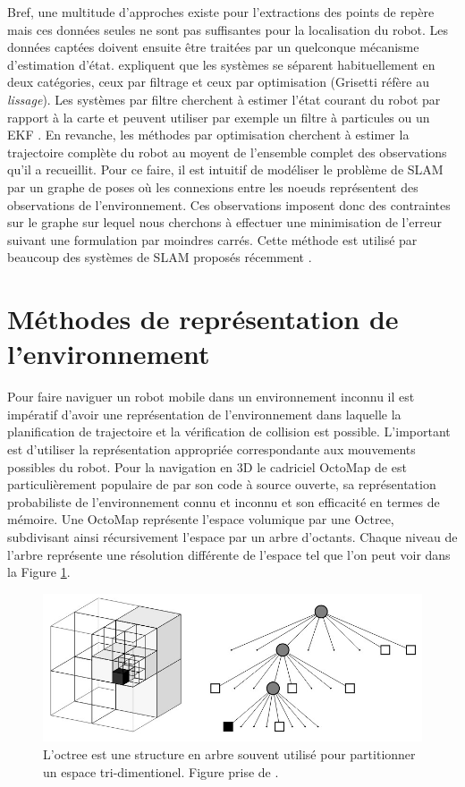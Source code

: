 Bref, une multitude d'approches existe pour l'extractions des points de repère mais ces données seules ne sont pas suffisantes pour la localisation du robot. Les données captées doivent ensuite être traitées par un quelconque mécanisme d'estimation d'état. \cite{Grisetti2010} expliquent que les systèmes se séparent habituellement en deux catégories, ceux par filtrage et ceux par optimisation (Grisetti réfère au \textit{lissage}). Les systèmes par filtre cherchent à estimer l'état courant du robot par rapport à la carte et peuvent utiliser par exemple un filtre à particules \citep{Grisetti2007} ou un EKF \citep{Montemerlo03a}. En revanche, les méthodes par optimisation cherchent à estimer la trajectoire complète du robot au moyent de l'ensemble complet des observations qu'il a recueillit. Pour ce faire, il est intuitif de modéliser le problème de SLAM par un graphe de poses où les connexions entre les noeuds représentent des observations de l'environnement. Ces observations imposent donc des contraintes sur le graphe sur lequel nous cherchons à effectuer une minimisation de l'erreur suivant une formulation par moindres carrés. Cette méthode est utilisé par beaucoup des systèmes de SLAM proposés récemment \citep{Labbe2014, Hess2016}.

\section{Méthodes de représentation de l'environnement}\label{subsec:representations}

Pour faire naviguer un robot mobile dans un environnement inconnu il est impératif d'avoir une représentation de l'environnement dans laquelle la planification de trajectoire et la vérification de collision est possible. L'important est d'utiliser la représentation appropriée correspondante aux mouvements possibles du robot. Pour la navigation en 3D le cadriciel OctoMap de \cite{Hornung2013} est particulièrement populaire de par son code à source ouverte, sa représentation probabiliste de l'environnement connu et inconnu et son efficacité en termes de mémoire. Une OctoMap représente l'espace volumique par une Octree, subdivisant ainsi récursivement l'espace par un arbre d'octants. Chaque niveau de l'arbre représente une résolution différente de l'espace tel que l'on peut voir dans la Figure \ref{fig:octree}.

\begin{figure}[h]
  \centering
  \includegraphics[width=0.5\linewidth]{images/octree.jpg}
  \caption[Représentation graphique d'une Octree]{L'octree est une structure en arbre souvent utilisé pour partitionner un espace tri-dimentionel. Figure prise de \citep{Hornung2013}.}
  \label{fig:octree}
\end{figure}

